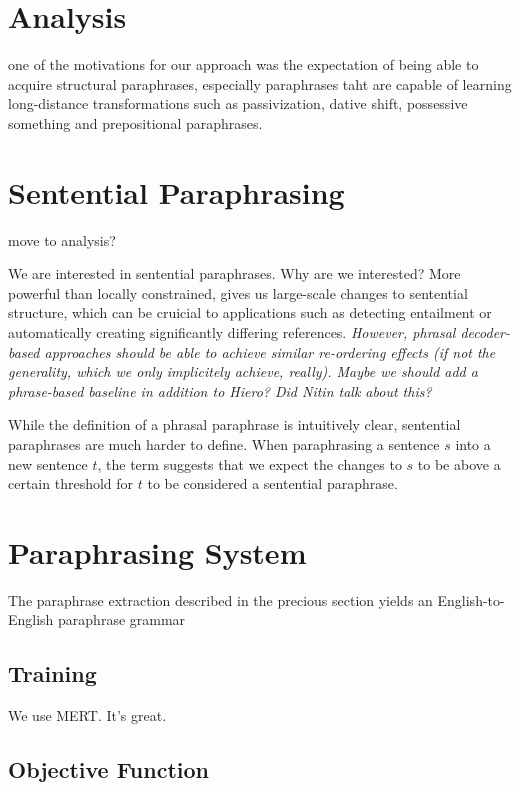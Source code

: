 \documentclass[11pt]{article}
\begin{document}
\section{Analysis} \label{analysis}

one of the motivations for our approach was the expectation of being
able to acquire structural paraphrases, especially paraphrases taht
are capable of learning long-distance transformations such as
passivization, dative shift, possessive something and prepositional
paraphrases.

\section{Sentential Paraphrasing} \label{sentential_paraphrasing}

move to analysis?

We are interested in sentential paraphrases. Why are we interested?
More powerful than locally constrained, gives us large-scale changes
to sentential structure, which can be cruicial to applications such as
detecting entailment or automatically creating significantly differing
references. \emph{However, phrasal decoder-based approaches should be
  able to achieve similar re-ordering effects (if not the generality,
  which we only implicitely achieve, really). Maybe we should add a
  phrase-based baseline in addition to Hiero? Did Nitin talk about
  this?}

While the definition of a phrasal paraphrase is intuitively clear,
sentential paraphrases are much harder to define. When paraphrasing a
sentence $s$ into a new sentence $t$, the term suggests that we expect
the changes to $s$ to be above a certain threshold for $t$ to be
considered a sentential paraphrase. 

\section{Paraphrasing System} \label{approach}

The paraphrase extraction described in the precious section yields an
English-to-English paraphrase grammar

\subsection{Training}

We use MERT. It's great.

\subsection{Objective Function} \label{features}
\end{document}

